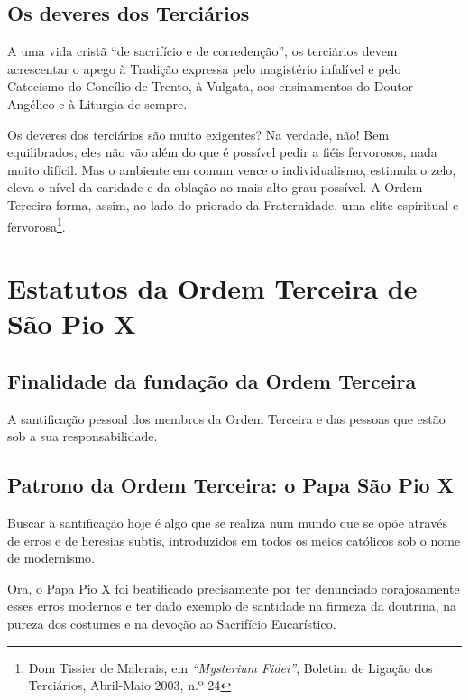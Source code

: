 \documentclass[11pt]{article}
\begin{document}
\subsection{Os deveres dos Terciários}\label{subsec:os-deveres-dos-terciários}

A uma vida cristã ``de sacrifício e de corredenção'', os terciários devem acrescentar o apego à Tradição expressa pelo magistério infalível e pelo Catecismo do Concílio de Trento, à Vulgata, aos ensinamentos do Doutor Angélico e à Liturgia de sempre.

Os deveres dos terciários são muito exigentes?
Na verdade, não!
Bem equilibrados, eles não vão além do que é possível pedir a fiéis fervorosos, nada muito difícil.
Mas o ambiente em comum vence o individualismo, estimula o zelo, eleva o nível da caridade e da oblação ao mais alto grau possível.
A Ordem Terceira forma, assim, ao lado do priorado da Fraternidade, uma elite espiritual e fervorosa\footnote{Dom Tissier de Malerais, em \textit{``Mysterium Fidei''}, Boletim de Ligação dos Terciários, Abril-Maio 2003, n.º 24}.

\section{Estatutos da Ordem Terceira de São Pio X}\label{sec:estatutos-da-ordem-terceira-de-são-pio-x}

\subsection{Finalidade da fundação da Ordem Terceira}\label{subsec:finalidade-da-fundação-da-ordem-terceira}

A santificação pessoal dos membros da Ordem Terceira e das pessoas que estão sob a sua responsabilidade.

\subsection{Patrono da Ordem Terceira: o Papa São Pio X}\label{subsec:patrono-da-ordem-terceira:-o-papa-são-pio-x}

Buscar a santificação hoje é algo que se realiza num mundo que se opõe através de erros e de heresias subtis, introduzidos em todos os meios católicos sob o nome de modernismo.

Ora, o Papa Pio X foi beatificado precisamente por ter denunciado corajosamente esses erros modernos e ter dado exemplo de santidade na firmeza da doutrina, na pureza dos costumes e na devoção ao Sacrifício Eucarístico.
\end{document}
